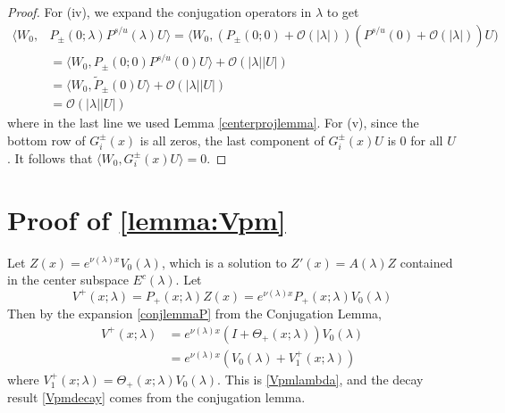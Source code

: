 \documentclass[thesis.tex]{subfiles}
\begin{document}
\begin{lemma}
\begin{proof}
For (iv), we expand the conjugation operators in $\lambda$ to get
\begin{align*}
\langle W_0, &P_\pm(0; \lambda)P^{s/u}(\lambda) U \rangle =
\langle W_0, (P_\pm(0; 0) + \mathcal{O}(|\lambda|))(P^{s/u}(0) + \mathcal{O}(|\lambda|)) U) \\
&= \langle W_0, P_\pm(0; 0) P^{s/u}(0)U \rangle + \mathcal{O}(|\lambda||U|) \\
&= \langle W_0, \tilde{P}_\pm(0) U \rangle + \mathcal{O}(|\lambda||U|) \\
&= \mathcal{O}(|\lambda||U|) 
\end{align*}
where in the last line we used Lemma \ref{centerprojlemma}. For (v), since the bottom row of $G_i^\pm(x)$ is all zeros, the last component of $G_i^\pm(x) U$ is 0 for all $U$. It follows that $\langle W_0, G_i^\pm(x) U\rangle = 0$. 
\end{proof}
\end{lemma}

\section{Proof of \cref{lemma:Vpm}}\label{sec:Vpmproof}

Let $Z(x) = e^{\nu(\lambda)x}V_0(\lambda)$, which is a solution to $Z'(x) = A(\lambda)Z$ contained in the center subspace $E^c(\lambda)$. Let
\[
V^+(x; \lambda) = P_+(x; \lambda) Z(x) = e^{\nu(\lambda)x}P_+(x; \lambda)V_0(\lambda)
\]
Then by the expansion \eqref{conjlemmaP} from the Conjugation Lemma,
\begin{align*}
V^+(x; \lambda) &= e^{\nu(\lambda)x}(I + \Theta_+(x; \lambda))V_0(\lambda) \\
&= e^{\nu(\lambda)x}( V_0(\lambda) + V_1^+(x; \lambda))
\end{align*}
where $V_1^+(x; \lambda) = \Theta_+(x; \lambda) V_0(\lambda)$. This is \eqref{Vpmlambda}, and the decay result \eqref{Vpmdecay} comes from the conjugation lemma.
\end{document}
